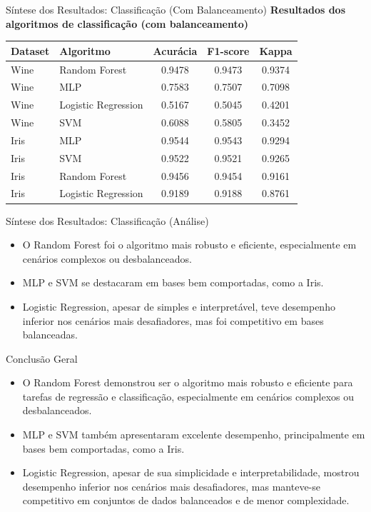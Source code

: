 \documentclass[aspectratio=169]{beamer}
\begin{document}
\begin{frame}{Síntese dos Resultados: Classificação (Com Balanceamento)}
  \centering
  \scriptsize
  \textbf{Resultados dos algoritmos de classificação (com balanceamento)}
  \vspace{0.5em}

  \begin{tabular}{llccc}
    \toprule
    \textbf{Dataset} & \textbf{Algoritmo} & \textbf{Acurácia} & \textbf{F1-score} & \textbf{Kappa} \\
    \midrule
    Wine & Random Forest & 0.9478 & 0.9473 & 0.9374 \\
    Wine & MLP & 0.7583 & 0.7507 & 0.7098 \\
    Wine & Logistic Regression & 0.5167 & 0.5045 & 0.4201 \\
    Wine & SVM & 0.6088 & 0.5805 & 0.3452 \\
    Iris & MLP & 0.9544 & 0.9543 & 0.9294 \\
    Iris & SVM & 0.9522 & 0.9521 & 0.9265 \\
    Iris & Random Forest & 0.9456 & 0.9454 & 0.9161 \\
    Iris & Logistic Regression & 0.9189 & 0.9188 & 0.8761 \\
    \bottomrule
  \end{tabular}
\end{frame}

\begin{frame}{Síntese dos Resultados: Classificação (Análise)}
  \begin{itemize}
    \item O Random Forest foi o algoritmo mais robusto e eficiente, especialmente em cenários complexos ou desbalanceados.
    \item MLP e SVM se destacaram em bases bem comportadas, como a Iris.
    \item Logistic Regression, apesar de simples e interpretável, teve desempenho inferior nos cenários mais desafiadores, mas foi competitivo em bases balanceadas.
  \end{itemize}
\end{frame}

\begin{frame}{Conclusão Geral}
  \begin{itemize}
    \item O Random Forest demonstrou ser o algoritmo mais robusto e eficiente para tarefas de regressão e classificação, especialmente em cenários complexos ou desbalanceados.
    \item MLP e SVM também apresentaram excelente desempenho, principalmente em bases bem comportadas, como a Iris.
    \item Logistic Regression, apesar de sua simplicidade e interpretabilidade, mostrou desempenho inferior nos cenários mais desafiadores, mas manteve-se competitivo em conjuntos de dados balanceados e de menor complexidade.
  \end{itemize}
\end{frame}
\end{document}
